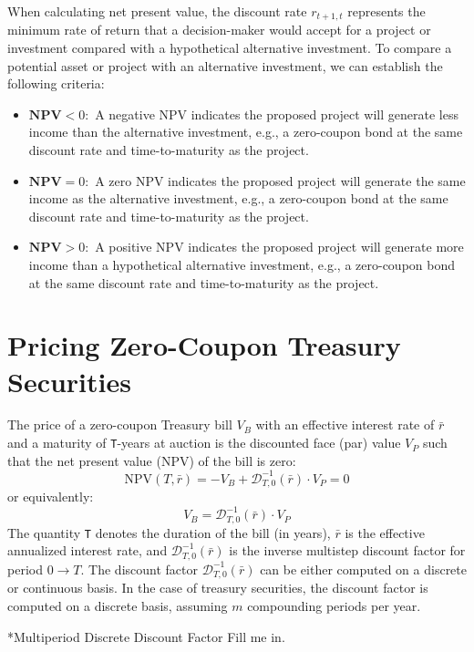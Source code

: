 \documentclass[11pt]{article}
\makeatletter
\theoremstyle{definition}
\renewcommand\subsection{\@startsection
	{subsection}{2}{0mm}
	{-0.05in}
	{0.5\baselineskip}
	{\normalfont\normalsize\bfseries}}
\makeatother
\begin{document}
When calculating net present value, the discount rate $r_{t+1,t}$ represents the minimum rate of return that a decision-maker would accept 
for a project or investment compared with a hypothetical alternative investment. 
To compare a potential asset or project with an alternative investment, we can establish the following criteria:
\begin{itemize}
\item{$\textbf{NPV}<0$:~}{A negative NPV indicates the proposed project will generate less income than the alternative investment, e.g., a zero-coupon bond at the same discount rate and time-to-maturity as the project.}
\item{$\textbf{NPV}=0$:~}{A zero NPV indicates the proposed project will generate the same income as the alternative investment, e.g., a zero-coupon bond at the same discount rate and time-to-maturity as the project. }
\item{$\textbf{NPV}>0$:~}{A positive NPV indicates the proposed project will generate more income than a hypothetical alternative investment, e.g., a zero-coupon bond at the same discount rate and time-to-maturity as the project.}
\end{itemize}

\section*{Pricing Zero-Coupon Treasury Securities}\label{sec:zero-coupon-treasury-securities}
The price of a zero-coupon Treasury bill $V_{B}$ with an effective interest rate of $\bar{r}$ and a maturity of \texttt{T}-years at auction 
is the discounted face (par) value $V_{P}$ such that the net present value (NPV) of the bill is zero:
\begin{equation}    
\text{NPV}(T,\bar{r}) = -V_{B} + \mathcal{D}_{T,0}^{-1}(\bar{r})\cdot{V_{P}} = 0
\end{equation}
or equivalently:
\begin{equation}
    V_{B} = \mathcal{D}_{T,0}^{-1}(\bar{r})\cdot{V_{P}}
\end{equation}
The quantity \texttt{T} denotes the duration of the bill (in years), 
$\bar{r}$ is the effective annualized interest rate,  and $\mathcal{D}_{T,0}^{-1}(\bar{r})$ is the inverse multistep discount factor
for period $0\rightarrow{T}$. 
The discount factor $\mathcal{D}_{T,0}^{-1}(\bar{r})$ can be either computed on a discrete or continuous basis. 
In the case of treasury securities, the discount factor is computed on a discrete basis, assuming $m$ compounding periods per year.

\subsection*{Multiperiod Discrete Discount Factor}
Fill me in.


\clearpage
\printindex
\end{document}
